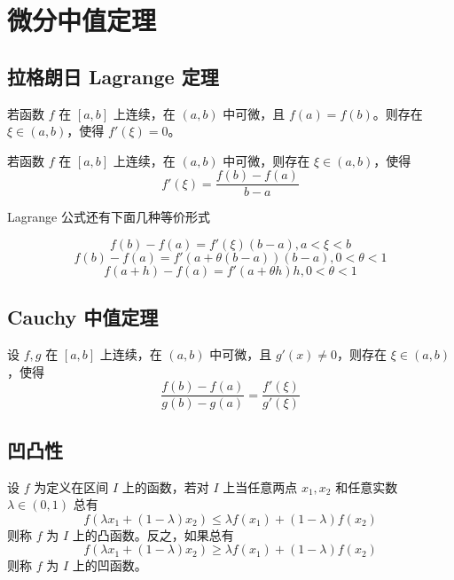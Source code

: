 \chapter{微分中值定理}

\section{拉格朗日 Lagrange 定理}

\begin{theorem}
    若函数 $f$ 在 $[a,b]$ 上连续，在 $(a,b)$ 中可微，且 $f(a)=f(b)$。则存在 $\xi\in(a,b)$，使得 $f'(\xi)=0$。
\end{theorem}

\begin{theorem}
    若函数 $f$ 在 $[a,b]$ 上连续，在 $(a,b)$ 中可微，则存在 $\xi\in(a,b)$，使得
    $$f'(\xi)=\frac{f(b)-f(a)}{b-a}$$
\end{theorem}

Lagrange 公式还有下面几种等价形式

$$f(b)-f(a) = f'(\xi)(b-a),a<\xi<b$$
$$f(b)-f(a) = f'(a+\theta(b-a))(b-a),0<\theta<1$$
$$f(a+h) - f(a) = f'(a+\theta h)h,0<\theta<1$$

\section{Cauchy 中值定理}

\begin{theorem}
    设 $f,g$ 在 $[a,b]$ 上连续，在 $(a,b)$ 中可微，且 $g'(x)\ne 0$，则存在 $\xi\in (a,b)$，使得
    $$\frac{f(b)-f(a)}{g(b)-g(a)} = \frac{f'(\xi)}{g'(\xi)}$$
\end{theorem}

\section{凹凸性}

\begin{definition}
    设 $f$ 为定义在区间 $I$ 上的函数，若对 $I$ 上当任意两点 $x_1,x_2$ 和任意实数 $\lambda\in (0,1)$ 总有
    $$f(\lambda x_1+(1-\lambda)x_2) \leqslant \lambda f(x_1)+(1-\lambda)f(x_2)$$
    则称 $f$ 为 $I$ 上的凸函数。反之，如果总有
    $$f(\lambda x_1+(1-\lambda)x_2) \geqslant \lambda f(x_1)+(1-\lambda)f(x_2)$$
    则称 $f$ 为 $I$ 上的凹函数。
\end{definition}

